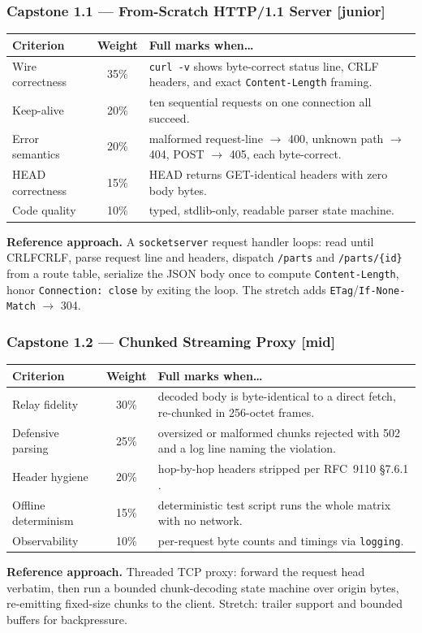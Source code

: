 \subsubsection*{Capstone 1.1 --- From-Scratch HTTP/1.1 Server [junior]}
\begin{center}\small
\begin{tabularx}{\textwidth}{l c X}
\toprule
\textbf{Criterion} & \textbf{Weight} & \textbf{Full marks when\ldots} \\
\midrule
Wire correctness & 35\% & \texttt{curl -v} shows byte-correct status line, CRLF headers, and exact \texttt{Content-Length} framing. \\
Keep-alive & 20\% & ten sequential requests on one connection all succeed. \\
Error semantics & 20\% & malformed request-line $\to$ 400, unknown path $\to$ 404, POST $\to$ 405, each byte-correct. \\
HEAD correctness & 15\% & HEAD returns GET-identical headers with zero body bytes. \\
Code quality & 10\% & typed, stdlib-only, readable parser state machine. \\
\bottomrule
\end{tabularx}
\end{center}
\textbf{Reference approach.} A \texttt{socketserver} request handler loops:
read until CRLFCRLF, parse request line and headers, dispatch
\texttt{/parts} and \texttt{/parts/\{id\}} from a route table, serialize the
JSON body once to compute \texttt{Content-Length}, honor
\texttt{Connection: close} by exiting the loop. The stretch adds
\texttt{ETag}/\texttt{If-None-Match} $\to$ 304.

\subsubsection*{Capstone 1.2 --- Chunked Streaming Proxy [mid]}
\begin{center}\small
\begin{tabularx}{\textwidth}{l c X}
\toprule
\textbf{Criterion} & \textbf{Weight} & \textbf{Full marks when\ldots} \\
\midrule
Relay fidelity & 30\% & decoded body is byte-identical to a direct fetch, re-chunked in 256-octet frames. \\
Defensive parsing & 25\% & oversized or malformed chunks rejected with 502 and a log line naming the violation. \\
Header hygiene & 20\% & hop-by-hop headers stripped per RFC~9110 \S7.6.1 \cite{rfc9110}. \\
Offline determinism & 15\% & deterministic test script runs the whole matrix with no network. \\
Observability & 10\% & per-request byte counts and timings via \texttt{logging}. \\
\bottomrule
\end{tabularx}
\end{center}
\textbf{Reference approach.} Threaded TCP proxy: forward the request head
verbatim, then run a bounded chunk-decoding state machine over origin bytes,
re-emitting fixed-size chunks to the client. Stretch: trailer support and
bounded buffers for backpressure.

